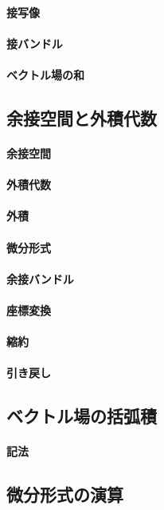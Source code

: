 \paragraph{接写像}
\paragraph{接バンドル}
\paragraph{ベクトル場の和}
\subsection*{余接空間と外積代数}
\paragraph{余接空間}
\paragraph{外積代数}
\paragraph{外積}
\paragraph{微分形式}
\paragraph{余接バンドル}
\paragraph{座標変換}
\paragraph{縮約}
\paragraph{引き戻し}
\subsection*{ベクトル場の括弧積}
\paragraph{記法}
\subsection*{微分形式の演算}
